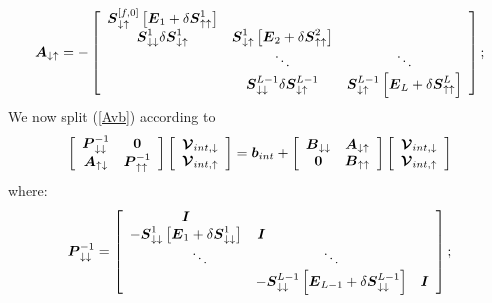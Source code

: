 \[
{\mbox{\boldmath$\mit A$\unboldmath}}_{ \downarrow \uparrow }=-\left[{\begin{array}{ccc}{\mbox{\boldmath$\mit S$\unboldmath}}_{ 
\downarrow \uparrow }^{[f,0]} 
\left[{\mbox{\boldmath$\mit E$\unboldmath}}_{1}+{\mit \delta} {  \mbox{\boldmath$\mit S$\unboldmath}}_{ \uparrow \uparrow }^{1}\right]&&\\ {  \mbox{\boldmath$\mit S$\unboldmath}}_{\downarrow \downarrow }^{  1}{\mit \delta} 
{  \mbox{\boldmath$\mit S$\unboldmath}}_{\downarrow \uparrow }^{  1}&{  \mbox{\boldmath$\mit S$\unboldmath}}_{\downarrow 
\uparrow }^{  1}\left[{\mbox{\boldmath$\mit E$\unboldmath}}_{2}+{\mit \delta} {  \mbox{\boldmath$\mit S$\unboldmath}}_{ \uparrow \uparrow 
}^{2}\right]&\\ &\ddots &\ddots\\ &{ \mbox{\boldmath$\mit S$\unboldmath}}_{\downarrow \downarrow }^{ L-1}{\mit \delta} { 
 \mbox{\boldmath$\mit S$\unboldmath}}_{\downarrow \uparrow }^{  L-1}&{  \mbox{\boldmath$\mit S$\unboldmath}}_{\downarrow 
\uparrow }^{  L-1}\left[{\mbox{\boldmath$\mit E$\unboldmath}}_{L}+{\mit \delta} {  \mbox{\boldmath$\mit S$\unboldmath}}_{ \uparrow 
\uparrow }^{L}\right]\end{array}}\right];
\]
We now split (\ref{Avb}) according to
\begin{equation} \label{Fsplit}
\left[{\begin{array}{cc}{\mbox{\boldmath$\mit P$\unboldmath}}_{ \downarrow \downarrow }^{-1}&{\bf 0}\\ 
{\mbox{\boldmath$\mit A$\unboldmath}}_{ \uparrow \downarrow }&{\mbox{\boldmath$\mit P$\unboldmath}}_{ \uparrow \uparrow 
}^{-1}\end{array}}\right]\left[{\begin{array}{c}{\mbox{\boldmath$\cal V$\unboldmath}}_{int, \downarrow 
}\\ {\mbox{\boldmath$\cal V$\unboldmath}}_{int, \uparrow 
}\end{array}}\right]={\mbox{\boldmath$\mit b$\unboldmath}}_{int}+\left[{\begin{array}{cc}{\mbox{\boldmath$\mit B$\unboldmath}}_{ \downarrow 
\downarrow }&{\mbox{\boldmath$\mit A$\unboldmath}}_{ \downarrow \uparrow }\\ {\bf 0}&{\mbox{\boldmath$\mit B$\unboldmath}}_{ \uparrow \uparrow 
}\end{array}}\right]\left[{\begin{array}{c}{\mbox{\boldmath$\cal V$\unboldmath}}_{int, \downarrow }\\ 
{\mbox{\boldmath$\cal V$\unboldmath}}_{int, \uparrow }\end{array}}\right]
\end{equation} 
where:
\[
{\bmi P}_{ \downarrow \downarrow }^{-1}
=\left[{\begin{array}{ccc}{\bmi I}&&\\ -{\bmi S}_{ \downarrow \downarrow }^{1} 
\left[{\bmi E}_{1}+{\mit \delta} {  \bmi S}_{ \downarrow \downarrow }^{1}\right]&
\hspace{-10em} {\bmi I}&\\
\qquad \ddots &  \ddots &\\ 
&-{\bmi S}_{ \downarrow \downarrow 
}^{L-1} \left[{\bmi E}_{L-1}+{\mit \delta} {  \bmi S}_{ \downarrow \downarrow 
}^{L-1}\right]&{\bmi I}\end{array}}\right];
\]

